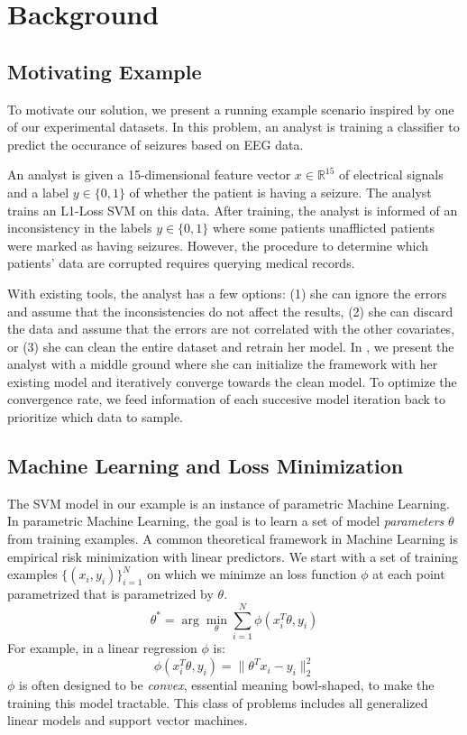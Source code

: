 \section{Background}
\subsection{Motivating Example}
To motivate our solution, we present a running example scenario inspired by
one of our experimental datasets.
In this problem, an analyst is training a classifier to predict the occurance 
of seizures based on EEG data.
\begin{example}
An analyst is given a 15-dimensional feature vector $x \in \mathbb{R}^{15}$ of electrical signals and a label $y\in \{0,1\}$ of whether the patient is having a seizure.
The analyst trains an L1-Loss SVM on this data.
After training, the analyst is informed of an inconsistency in the labels $y\in \{0,1\}$ where some patients unafflicted patients were marked as having seizures.
However, the procedure to determine which patients' data are corrupted requires querying medical records.
\end{example}
With existing tools, the analyst has a few options: (1) she can ignore the errors and assume that the inconsistencies do not affect the results, (2) she can discard the data and assume that the errors are not correlated with the other covariates, or (3) she can clean the entire dataset and retrain her model.
In \sys, we present the analyst with a middle ground where she can initialize the framework with her existing model and iteratively converge towards the clean model.
To optimize the convergence rate, we feed information of each succesive model iteration back to prioritize which data to sample.

\subsection{Machine Learning and Loss Minimization}
The SVM model in our example is an instance of parametric Machine Learning.
In parametric Machine Learning, the goal is to learn a set of model \emph{parameters} $\theta$ from training examples.
A common theoretical framework in Machine Learning is empirical risk minimization with linear predictors.
We start with a set of training examples $\{(x_{i},y_{i})\}_{i=1}^{N}$
on which we minimze an loss function $\phi$ at each point parametrized that is parametrized by $\theta$.
\[
 \theta^{*}=\arg\min_{\theta}\sum_{i=1}^{N}\phi(x_{i}^T\theta,y_{i})
\]
For example, in a linear regression $\phi$ is:
\[
\phi(x_{i}^T\theta,y_{i}) = \|\theta^Tx_{i} - y_i \|_2^2
\]
$\phi$ is often designed to be \emph{convex}, essential meaning bowl-shaped, to make the training this model 
tractable.
This class of problems includes all generalized linear models and support vector machines.

